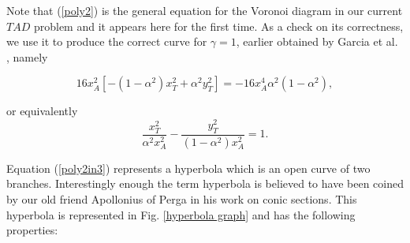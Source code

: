 \documentclass[final,5p,times,twocolumn]{elsarticle}
\begin{document}
Note that (\ref{poly2}) is the general equation for the Voronoi diagram in our current $TAD$ problem and it appears here for the first time. As a check on its correctness, we use it to produce the correct curve for $\gamma=1$, earlier obtained by Garcia et al. \cite{garcia2015escape}, namely
 
\begin{equation}
16 x_{A}^{2}[-(1-\alpha^{2})x_{T}^{2}+\alpha^{2} y_{T}^{2}]
=-16 x_{A}^{4}\alpha^2 (1-\alpha^{2}),
\label{poly2in3}
\end{equation}

or equivalently
\begin{equation}
\dfrac{x_{T}^{2}}{\alpha^{2}x_{A}^{2}}
- \dfrac{y_{T}^{2}}{(1-\alpha^{2})x_{A}^{2}}=1.
\label{hyperbola}
\end{equation}

Equation (\ref{poly2in3}) represents a hyperbola which is an open curve of two branches. Interestingly enough the term hyperbola is believed  to have been coined by our old friend Apollonius of Perga in his work on conic sections. This hyperbola is represented in Fig. \ref{hyperbola graph} and has the following properties:
\end{document}
